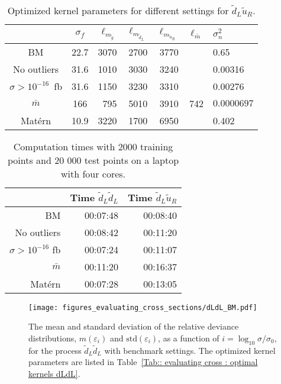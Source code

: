 \documentclass[twoside,english]{uiofysmaster}
\begin{document}
{\begin{table}
\centering
\begin{tabular}{@{}ccrrrrl@{}} \toprule
 & $\sigma_f$ & $\ell_{m_{\widetilde{g}}}$ & $\ell_{m_{\widetilde{d}_L}}$ & $\ell_{m_{\widetilde{u}_R}}$ & $\ell_{\bar{m}}$ &$\sigma_n^2$\\ \midrule
BM & 22.7 & 3070 & 2700 & 3770 && 0.65 \\
No outliers &  31.6& 1010 & 3030 & 3240&& 0.00316\\ 
$\sigma > 10^{-16}$~fb & 31.6 &1150  & 3230& 3310&& 0.00276 \\
$\bar{m}$ & 166 & 795&5010 &3910 & 742 & $0.0000697$\\
Mat\'{e}rn & 10.9 & 3220  &1700 & 6950 && 0.402\\ \bottomrule
\end{tabular}
\caption{Optimized kernel parameters for different settings for $\widetilde{d}_L \widetilde{u}_R$.}
\label{Tab:: evaluating cross : optimal kernels dLuR}
\end{table}
 
 
 
\begin{table}
\centering
\begin{tabular}{@{}rrr@{}} \toprule
& Time $\widetilde{d}_L \widetilde{d}_L$ & Time $\widetilde{d}_L \widetilde{u}_R$\\
\midrule
BM & 00:07:48 & 00:08:40\\
No outliers & 00:08:42 & 00:11:20\\
$\sigma > 10^{-16}$ fb & 00:07:24 & 00:11:07\\
$\bar{m}$ & 00:11:20 & 00:16:37\\
Mat\'{e}rn & 00:07:28 & 00:13:05\\ \bottomrule
\end{tabular}
\caption{Computation times with 2000 training points and 20 000 test points on a laptop with four cores.}
\label{Tab:: evaluating cross : computation times BM}
\end{table}


\begin{figure}
\centering
\texttt{[image: figures\_evaluating\_cross\_sections/dLdL\_BM.pdf]}
\caption{The mean and standard deviation of the relative deviance distributions, $m(\varepsilon_i)$ and $\mathrm{std}(\varepsilon_i)$, as a function of $i = \log_{10} \sigma / \sigma_0$, for the process $\widetilde{d}_L \widetilde{d}_L$ with benchmark settings. The optimized kernel parameters are listed in Table~\ref{Tab:: evaluating cross : optimal kernels dLdL}.}
\label{Fig:: evaluating cross : BM dLdL error plot}
\end{figure}

}
\end{document}
